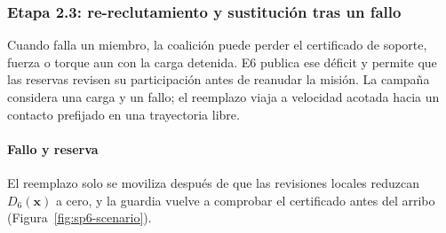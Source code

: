 \subsubsection{Etapa 2.3: re-reclutamiento y sustitución tras un fallo}
\label{subsubsec:sp2-recovery}

Cuando falla un miembro, la coalición puede perder el certificado de soporte, fuerza o torque aun con la carga detenida. E6 publica ese déficit y permite que las reservas revisen su participación antes de reanudar la misión. La campaña considera una carga y un fallo; el reemplazo viaja a velocidad acotada hacia un contacto prefijado en una trayectoria libre.

\paragraph{Fallo y reserva}

El reemplazo solo se moviliza después de que las revisiones locales reduzcan $D_6(\boldsymbol x)$ a cero, y la guardia vuelve a comprobar el certificado antes del arribo (Figura~\ref{fig:sp6-scenario}).

